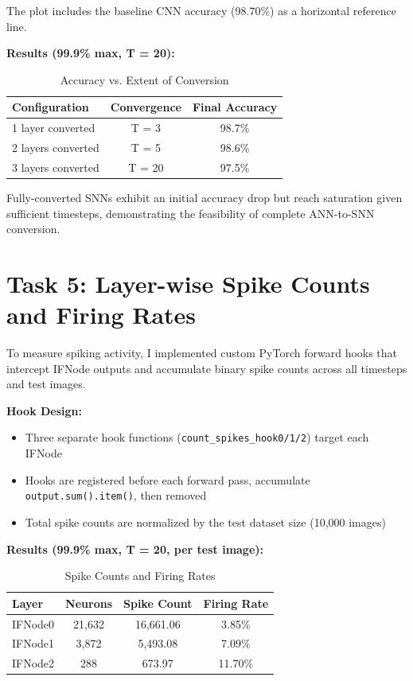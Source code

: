 \documentclass[11pt, a4paper]{article}
\begin{document}
The plot includes the baseline CNN accuracy (98.70\%) as a horizontal reference line.

\textbf{Results (99.9\% max, T = 20):}
\begin{table}[htbp]
  \centering
  \caption{Accuracy vs. Extent of Conversion}
  \label{tab:extent_conversion}
  \renewcommand{\arraystretch}{1.2}
  \begin{tabular}{l c c}
    \toprule
    \textbf{Configuration} & \textbf{Convergence} & \textbf{Final Accuracy} \\
    \midrule
    1 layer converted & T = 3 & 98.7\% \\
    2 layers converted & T = 5 & 98.6\% \\
    3 layers converted & T = 20 & 97.5\% \\
    \bottomrule
  \end{tabular}
\end{table}

Fully-converted SNNs exhibit an initial accuracy drop but reach saturation given sufficient timesteps, demonstrating the feasibility of complete ANN-to-SNN conversion.

\section{Task 5: Layer-wise Spike Counts and Firing Rates}

To measure spiking activity, I implemented custom PyTorch forward hooks that intercept IFNode outputs and accumulate binary spike counts across all timesteps and test images.

\textbf{Hook Design:}
\begin{itemize}
    \item Three separate hook functions (\texttt{count\_spikes\_hook0/1/2}) target each IFNode
    \item Hooks are registered before each forward pass, accumulate \texttt{output.sum().item()}, then removed
    \item Total spike counts are normalized by the test dataset size (10,000 images)
\end{itemize}

\textbf{Results (99.9\% max, T = 20, per test image):}
\begin{table}[htbp]
  \centering
  \caption{Spike Counts and Firing Rates}
  \label{tab:spike_counts}
  \renewcommand{\arraystretch}{1.2}
  \begin{tabular}{l c c c}
    \toprule
    \textbf{Layer} & \textbf{Neurons} & \textbf{Spike Count} & \textbf{Firing Rate} \\
    \midrule
    IFNode0 & 21,632 & 16,661.06 & 3.85\% \\
    IFNode1 & 3,872 & 5,493.08 & 7.09\% \\
    IFNode2 & 288 & 673.97 & 11.70\% \\
    \bottomrule
  \end{tabular}
\end{table}
\end{document}
